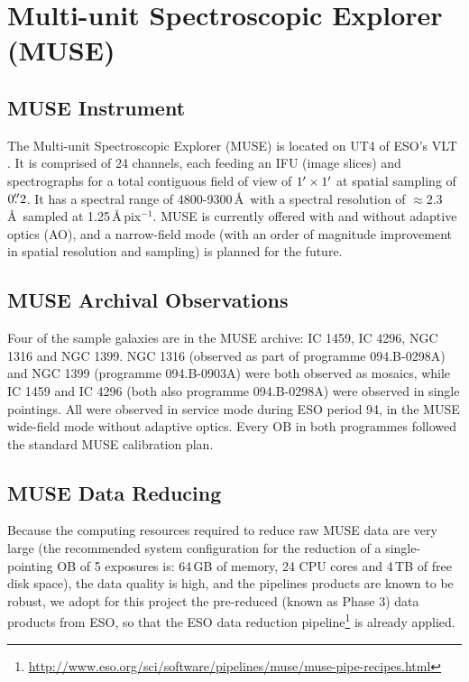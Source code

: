		
\section{Multi-unit Spectroscopic Explorer (MUSE)}
	\label{sec:MUSE}

	\subsection{MUSE Instrument}
		The Multi-unit Spectroscopic Explorer (MUSE) is located on UT4 of ESO's VLT \citep{Bacon2010}. It is comprised of 24 channels, each feeding an IFU (image slices) and spectrographs for a total contiguous field of view of $1\hbox{$^\prime$} \times 1\hbox{$^\prime$}$ at spatial sampling of $0\hbox{$.\!\!^{\prime\prime}$}2$. It has a spectral range of 4800-9300\,\AA\ with a spectral resolution of $\approx 2.3$\,\AA\ sampled at 1.25\,\AA\,pix$^{-1}$. MUSE is currently offered with and without adaptive optics (AO), and a narrow-field mode (with an order of magnitude improvement in spatial resolution and sampling) is planned for the future. 
		
	\subsection{MUSE Archival Observations}
		Four of the sample galaxies are in the MUSE archive: IC 1459, IC 4296, NGC 1316 and NGC 1399. NGC 1316 (observed as part of programme 094.B-0298A) and NGC 1399 (programme 094.B-0903A) were both observed as mosaics, while IC 1459 and IC 4296 (both also programme 094.B-0298A) were observed in single pointings. All were observed in service mode during ESO period 94, in the MUSE wide-field mode without adaptive optics. Every OB in both programmes followed the standard MUSE calibration plan.

	\subsection{MUSE Data Reducing}
		\label{subsec:MUSEreduction}
		
		Because the computing resources required to reduce raw MUSE data are very large (the recommended system configuration for the reduction of a single-pointing OB of 5 exposures is: 64\,GB of memory, 24 CPU cores and 4\,TB of free disk space), the data quality is high, and the pipelines products are known to be robust, we adopt for this project the pre-reduced (known as Phase 3) data products from ESO, so that the ESO data reduction pipeline\footnote{\url{http://www.eso.org/sci/software/pipelines/muse/muse-pipe-recipes.html}} is already applied. 

